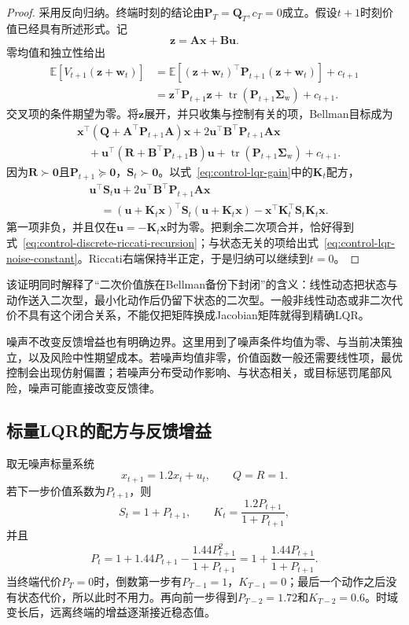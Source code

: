 \begin{proof}
采用反向归纳。终端时刻的结论由$\bm{P}_T=\bm{Q}_T,c_T=0$成立。假设$t+1$时刻价值已经具有所述形式。记
\[
  \bm{z}
  =
  \bm{A}\bm{x}+\bm{B}\bm{u}.
\]
零均值和独立性给出
\begin{align*}
  \mathbb{E}
  [V_{t+1}(\bm{z}+\bm{w}_t)]
  &=
  \mathbb{E}
  [(\bm{z}+\bm{w}_t)^{\top}
    \bm{P}_{t+1}
    (\bm{z}+\bm{w}_t)]
  +c_{t+1}\\
  &=
  \bm{z}^{\top}\bm{P}_{t+1}\bm{z}
  +
  \operatorname{tr}(\bm{P}_{t+1}\bm{\Sigma}_{\mathrm{w}})
  +c_{t+1}.
\end{align*}
交叉项的条件期望为零。将$\bm{z}$展开，并只收集与控制有关的项，Bellman目标成为
\begin{align*}
  &\bm{x}^{\top}
  (\bm{Q}+\bm{A}^{\top}\bm{P}_{t+1}\bm{A})
  \bm{x}
  +
  2\bm{u}^{\top}
  \bm{B}^{\top}\bm{P}_{t+1}\bm{A}\bm{x}\\
  &\quad+
  \bm{u}^{\top}
  (\bm{R}+\bm{B}^{\top}\bm{P}_{t+1}\bm{B})
  \bm{u}
  +
  \operatorname{tr}(\bm{P}_{t+1}\bm{\Sigma}_{\mathrm{w}})
  +c_{t+1}.
\end{align*}
因为$\bm{R}\succ\bm{0}$且$\bm{P}_{t+1}\succeq\bm{0}$，$\bm{S}_t\succ\bm{0}$。以式~\eqref{eq:control-lqr-gain}中的$\bm{K}_t$配方，
\begin{align*}
  &\bm{u}^{\top}\bm{S}_t\bm{u}
  +
  2\bm{u}^{\top}
  \bm{B}^{\top}\bm{P}_{t+1}\bm{A}\bm{x}\\
  &\quad=
  (\bm{u}+\bm{K}_t\bm{x})^{\top}
  \bm{S}_t
  (\bm{u}+\bm{K}_t\bm{x})
  -
  \bm{x}^{\top}\bm{K}_t^{\top}
  \bm{S}_t\bm{K}_t\bm{x}.
\end{align*}
第一项非负，并且仅在$\bm{u}=-\bm{K}_t\bm{x}$时为零。把剩余二次项合并，恰好得到式~\eqref{eq:control-discrete-riccati-recursion}；与状态无关的项给出式~\eqref{eq:control-lqr-noise-constant}。Riccati右端保持半正定，于是归纳可以继续到$t=0$。
\end{proof}
该证明同时解释了“二次价值族在Bellman备份下封闭”的含义：线性动态把状态与动作送入二次型，最小化动作后仍留下状态的二次型。一般非线性动态或非二次代价不具有这个闭合关系，不能仅把矩阵换成Jacobian矩阵就得到精确LQR。

噪声不改变反馈增益也有明确边界。这里用到了噪声条件均值为零、与当前决策独立，以及风险中性期望成本。若噪声均值非零，价值函数一般还需要线性项，最优控制会出现仿射偏置；若噪声分布受动作影响、与状态相关，或目标惩罚尾部风险，噪声可能直接改变反馈律。
\subsection{标量LQR的配方与反馈增益}
取无噪声标量系统
\[
  x_{t+1}=1.2x_t+u_t,
  \qquad
  Q=R=1.
\]
若下一步价值系数为$P_{t+1}$，则
\[
  S_t=1+P_{t+1},
  \qquad
  K_t=\frac{1.2P_{t+1}}{1+P_{t+1}},
\]
并且
\[
  P_t
  =
  1+1.44P_{t+1}
  -
  \frac{1.44P_{t+1}^2}{1+P_{t+1}}
  =
  1+\frac{1.44P_{t+1}}{1+P_{t+1}}.
\]
当终端代价$P_T=0$时，倒数第一步有$P_{T-1}=1$，$K_{T-1}=0$；最后一个动作之后没有状态代价，所以此时不用力。再向前一步得到$P_{T-2}=1.72$和$K_{T-2}=0.6$。时域变长后，远离终端的增益逐渐接近稳态值。
